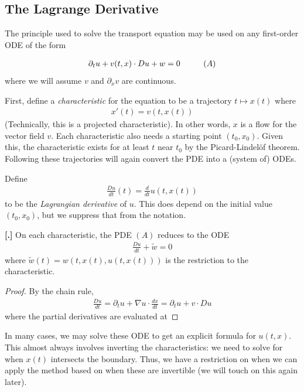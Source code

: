 \documentclass{article}
\newcommand{\pd}{\partial}
\newcounter{result}[section]
\newenvironment{res}[1][]{\vspace{0.5 cm} \refstepcounter{result}\par\medskip
	\noindent \textbf{[\thesection.\theresult] #1} \rmfamily}{\vspace{0.5 cm}}
\begin{document}
	\subsection{The Lagrange Derivative}
	
	The principle used to solve the transport equation may be used on any first-order ODE of the form
	
	\begin{align*}
		\pd_{t} u + v(t,x) \cdot Du + w = 0  \hspace{1 cm} (A)
	\end{align*} 
	where we will assume $v$ and $\pd_{x} v$ are continuous. 
	
	First, define a \textit{characteristic} for the equation to be a trajectory $t \mapsto x(t)$ where 
	\begin{align*}
		x'(t) = v(t,x(t))
	\end{align*}
	(Technically, this is a projected characteristic). In other words, $x$ is a flow for the vector field $v$. Each characteristic also needs a starting point $(t_0,x_0)$. Given this, the characteristic exists for at least $t$ near $t_0$ by the Picard-Lindel{\"o}f theorem. Following these trajectories will again convert the PDE into a (system of) ODEs. 
	
	Define 
	\begin{align*}
		\frac{Du}{dt}(t) = \frac{d}{dt} u(t,x(t))
	\end{align*}
	to be the \textit{Lagrangian derivative} of $u$. This does depend on the initial value $(t_0,x_0)$, but we suppress that from the notation. 
	
	\begin{res}
		On each characteristic, the PDE $(A)$ reduces to the ODE 
		\begin{align*}
			\frac{Du}{dt} + \tilde{w} = 0
		\end{align*}
		where $\tilde{w}(t) = w(t,x(t),u(t,x(t)))$ is the restriction to the characteristic. 
	\end{res}
	
	\begin{proof}
		By the chain rule,
		\begin{align*}
			\frac{Du}{dt} = \pd_{t} u + \nabla u \cdot \frac{dx}{dt} = \pd_{t}u + v \cdot Du
		\end{align*}
		where the partial derivatives are evaluated at 
	\end{proof}
	
	
	In many cases, we may solve these ODE to get an explicit formula for $u(t,x)$. This almost always involves inverting the characteristics: we need to solve for when $x(t)$ intersects the boundary. Thus, we have a restriction on when we can apply the method based on when these are invertible (we will touch on this again later). 
	
\end{document}
